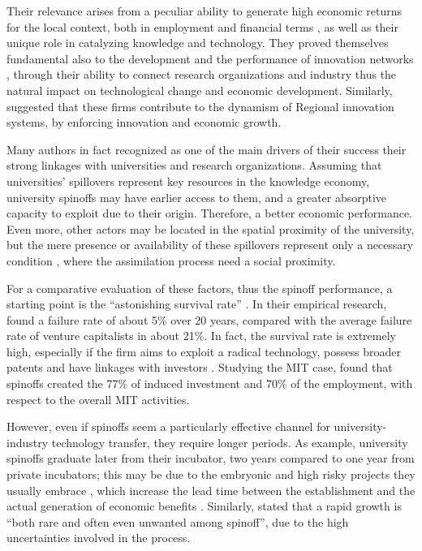 Their relevance arises from a peculiar ability to generate high economic returns for the local context, both in employment and financial terms \citep{OShea2004}, as well as their unique role in catalyzing knowledge and technology. They proved themselves fundamental also to the development and the performance of innovation networks \citep{Perez2003}, through their ability to connect research organizations and industry \citep{Rizzo2015} thus the natural impact on technological change and economic development. Similarly, \citet{Perez2003} suggested that these firms contribute to the dynamism of Regional innovation systems, by enforcing innovation and economic growth.

Many authors in fact recognized as one of the main drivers of their success their strong linkages with universities and research organizations. Assuming that universities' spillovers represent key resources in the knowledge economy, university spinoffs may have earlier access to them, and a greater absorptive capacity to exploit due to their origin. Therefore, a better economic performance. Even more, other actors may be located in the spatial proximity of the university, but the mere presence or availability of these spillovers represent only a necessary condition \citep{Colombo2010}, where the assimilation process need a social proximity.

For a comparative evaluation of these factors, thus the spinoff performance, a starting point is the \enquote{astonishing survival rate} \citep{Balderi2007}. In their empirical research, \citet{Leitch2005} found a failure rate of about 5\% over 20 years, compared with the average failure rate of venture capitalists in about 21\%. In fact, the survival rate is extremely high, especially if the firm aims to exploit a radical technology, possess broader patents and have linkages with investors \citep{OShea2004}. Studying the MIT case, \citet{Rogers2001} found that spinoffs created the 77\% of induced investment and 70\% of the employment, with respect to the overall MIT activities.

However, even if spinoffs seem a particularly effective channel for university-industry technology transfer, they require longer periods. As example, university spinoffs graduate later from their incubator, two years compared to one year from private incubators; this may be due to the embryonic and high risky projects they usually embrace \citep{Rothaermel2005}, which increase the lead time between the establishment and the actual generation of economic benefits \citep{Leitch2005}. Similarly, \citet{Perez2003} stated that a rapid growth is \enquote{both rare and often even unwanted among spinoff}, due to the high uncertainties involved in the process.

